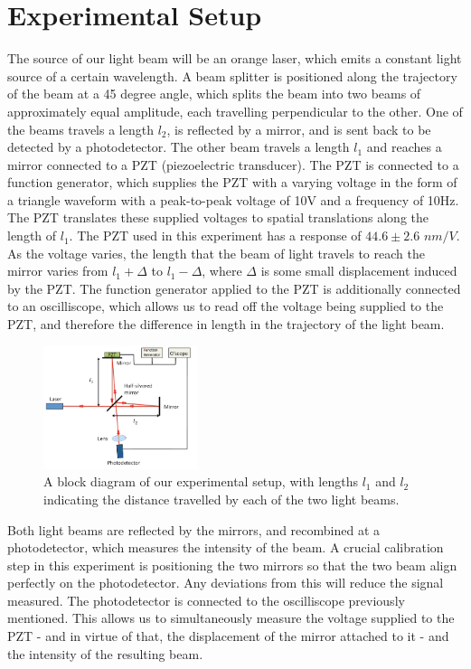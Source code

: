   \section{Experimental Setup}
  The source of our light beam will be an orange laser, which emits a constant light source of a certain wavelength. A beam splitter is positioned along the trajectory of the beam at a 45 degree angle, which splits the beam into two beams of approximately equal amplitude, each travelling perpendicular to the other. One of the beams travels a length $l_2$, is reflected by a mirror, and is sent back to be detected by a photodetector. The other beam travels a length $l_1$ and reaches a mirror connected to a PZT (piezoelectric transducer). The PZT is connected to a function generator, which supplies the PZT with a varying voltage in the form of a triangle waveform with a peak-to-peak voltage of 10V and a frequency of 10Hz. The PZT translates these supplied voltages to spatial translations along the length of $l_1$. The PZT used in this experiment has a response of $44.6 \pm 2.6$ $nm/V$. As the voltage varies, the length that the beam of light travels to reach the mirror varies from $l_1 + \Delta$ to $l_1 - \Delta$, where $\Delta$ is some small displacement induced by the PZT. The function generator applied to the PZT is additionally connected to an oscilliscope, which allows us to read off the voltage being supplied to the PZT, and therefore the difference in length in the trajectory of the light beam.
  \\
  \begin{figure}[t]
    \includegraphics[width=0.4\textwidth]{setup.png}
    \caption{A block diagram of our experimental setup, with lengths $l_1$ and $l_2$ indicating the distance travelled by each of the two light beams. \cite{michelsonmanual}}
  \end{figure}
  Both light beams are reflected by the mirrors, and recombined at a photodetector, which measures the intensity of the beam. A crucial calibration step in this experiment is positioning the two mirrors so that the two beam align perfectly on the photodetector. Any deviations from this will reduce the signal measured. The photodetector is connected to the oscilliscope previously mentioned. This allows us to simultaneously measure the voltage supplied to the PZT - and in virtue of that, the displacement of the mirror attached to it - and the intensity of the resulting beam.
